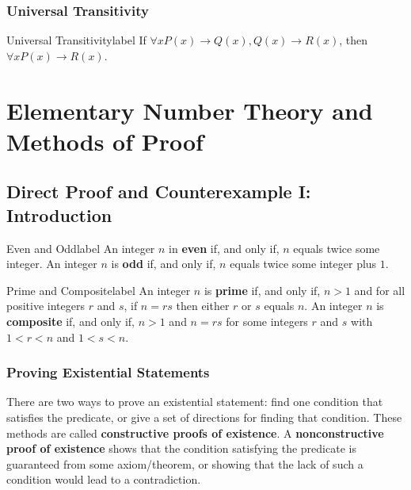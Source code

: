 \documentclass[a4paper]{report}
\begin{document}
\subsection{Universal Transitivity}

\begin{definition}{Universal Transitivity}{label}
    If $\forall x P(x) \to Q(x), Q(x) \to R(x)$, then $\forall x P(x) \to R(x)$.
\end{definition}



\chapter{Elementary Number Theory and Methods of Proof}

\section{Direct Proof and Counterexample I: Introduction}

\begin{definition}{Even and Odd}{label}
    An integer $n$ in \textbf{even} if, and only if, $n$ equals twice some integer. An integer $n$ is \textbf{odd} if, and only if,
    $n$ equals twice some integer plus $1$.
\end{definition}

\begin{definition}{Prime and Composite}{label}
    An integer $n$ is \textbf{prime} if, and only if, $n > 1$ and for all positive integers $r$ and $s$, if $n=rs$ then either
    $r$ or $s$ equals $n$. An integer $n$ is \textbf{composite} if, and only if, $n > 1$ and $n = rs$ for some integers
    $r$ and $s$ with $1 < r < n$ and $1 < s < n$.
\end{definition}

\subsection{Proving Existential Statements}

There are two ways to prove an existential statement: find one condition that satisfies the predicate,
or give a set of directions for finding that condition. These methods are called
\textbf{constructive proofs of existence}. A \textbf{nonconstructive proof of existence} shows that
the condition satisfying the predicate is guaranteed from some axiom/theorem, or showing that the lack
of such a condition would lead to a contradiction.
\end{document}
